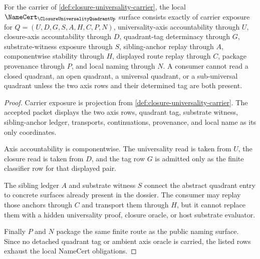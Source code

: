 \begin{theorem}
\label{thm:closure-universality-quadrant-namecert-obligations}
For the carrier of \autoref{def:closure-universality-carrier}, the local $\NameCert_{\ClosureUniversalityQuadrantUp}$ surface consists exactly of carrier exposure for $Q=(U,D,G,S,A,H,C,P,N)$, universality-axis accountability through $U$, closure-axis accountability through $D$, quadrant-tag determinacy through $G$, substrate-witness exposure through $S$, sibling-anchor replay through $A$, componentwise stability through $H$, displayed route replay through $C$, package provenance through $P$, and local naming through $N$. A consumer cannot read a closed quadrant, an open quadrant, a universal quadrant, or a sub-universal quadrant unless the two axis rows and their determined tag are both present.
\end{theorem}
\begin{proof}
Carrier exposure is projection from \autoref{def:closure-universality-carrier}. The accepted packet displays the two axis rows, quadrant tag, substrate witness, sibling-anchor ledger, transports, continuations, provenance, and local name as its only coordinates.

Axis accountability is componentwise. The universality read is taken from $U$, the closure read is taken from $D$, and the tag row $G$ is admitted only as the finite classifier row for that displayed pair.

The sibling ledger $A$ and substrate witness $S$ connect the abstract quadrant entry to concrete surfaces already present in the dossier. The consumer may replay those anchors through $C$ and transport them through $H$, but it cannot replace them with a hidden universality proof, closure oracle, or host substrate evaluator.

Finally $P$ and $N$ package the same finite route as the public naming surface. Since no detached quadrant tag or ambient axis oracle is carried, the listed rows exhaust the local NameCert obligations.
\end{proof}

